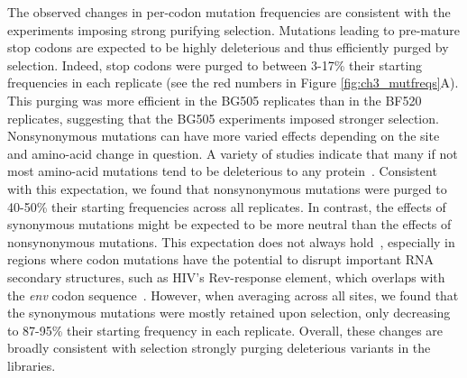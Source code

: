 \documentclass[9pt]{elife}
\begin{document}
The observed changes in per-codon mutation frequencies are consistent with the experiments imposing strong purifying selection.
Mutations leading to pre-mature stop codons are expected to be highly deleterious and thus efficiently purged by selection.
Indeed, stop codons were purged to between 3-17\% their starting frequencies in each replicate (see the red numbers in Figure \ref{fig:ch3_mutfreqs}A).
This purging was more efficient in the BG505 replicates than in the BF520 replicates, suggesting that the BG505 experiments imposed stronger selection.
Nonsynonymous mutations can have more varied effects depending on the site and amino-acid change in question.
A variety of studies indicate that many if not most amino-acid mutations tend to be deleterious to any protein~\cite{guo2004protein,shafikhani1997generation,bloom2005thermodynamic}.
Consistent with this expectation, we found that nonsynonymous mutations were purged to 40-50\% their starting frequencies across all replicates.
In contrast, the effects of synonymous mutations might be expected to be more neutral than the effects of nonsynonymous mutations.
This expectation does not always hold~\cite{parmley2006evidence,cuevas2012fitness,subramaniam2013serine,zanini2013quantifying}, especially in regions where codon mutations have the potential to disrupt important RNA secondary structures, such as HIV's Rev-response element, which overlaps with the \textit{env} codon sequence~\cite{fernandes2012hiv,haddox2016experimental}.
However, when averaging across all sites, we found that the synonymous mutations were mostly retained upon selection, only decreasing to 87-95\% their starting frequency in each replicate.
Overall, these changes are broadly consistent with selection strongly purging deleterious variants in the libraries.
\end{document}
